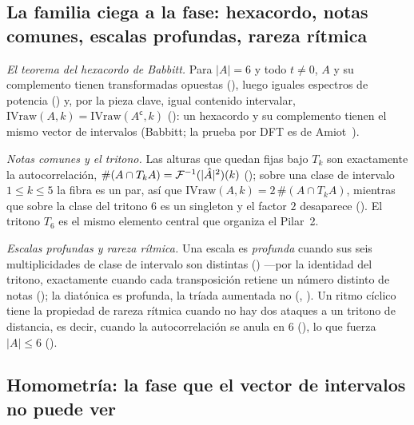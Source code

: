 \subsection{La familia ciega a la fase: hexacordo, notas comunes, escalas profundas, rareza rítmica}
\label{sec:p1-family}


\emph{El teorema del hexacordo de Babbitt.} Para $|A|=6$ y todo $t\neq0$, $A$ y su complemento tienen
transformadas opuestas (), luego iguales espectros de potencia
() y, por la pieza clave, igual contenido intervalar,
$\mathrm{IVraw}(A,k)=\mathrm{IVraw}(A^{\mathsf c},k)$ (): un hexacordo y su
complemento tienen el mismo vector de intervalos (Babbitt; la prueba por DFT es de Amiot~\cite{Amiot}).

\emph{Notas comunes y el tritono.} Las alturas que quedan fijas bajo $T_k$ son exactamente la
autocorrelación, $\#(A\cap T_kA)=\mathcal{F}^{-1}(|\hat{A}|^2)(k)$ (); sobre una clase de
intervalo $1\le k\le5$ la fibra es un par, así que $\mathrm{IVraw}(A,k)=2\,\#(A\cap T_kA)$, mientras que
sobre la clase del tritono $6$ es un singleton y el factor $2$ desaparece (). El
tritono $T_6$ es el mismo elemento central que organiza el Pilar~2.

\emph{Escalas profundas y rareza rítmica.} Una escala es \emph{profunda} cuando sus seis multiplicidades de
clase de intervalo son distintas () ---por la identidad del tritono, exactamente cuando cada
transposición retiene un número distinto de notas (); la diatónica es
profunda, la tríada aumentada no (, ). Un ritmo cíclico
tiene la propiedad de rareza rítmica cuando no hay dos ataques a un tritono de distancia, es decir, cuando
la autocorrelación se anula en $6$ (), lo que fuerza $|A|\le6$
().

\subsection{Homometría: la fase que el vector de intervalos no puede ver}\label{sec:p1-homometry}


